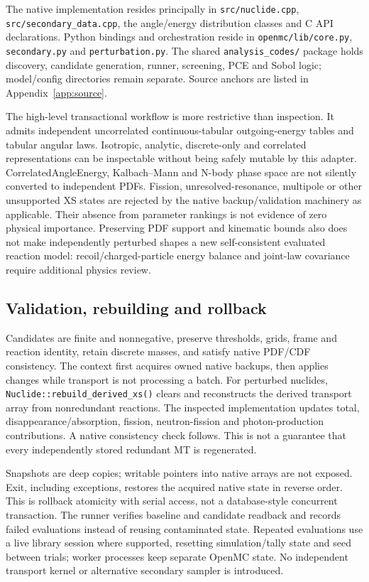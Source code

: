 The native implementation resides principally in \texttt{src/nuclide.cpp}, \texttt{src/secondary\_data.cpp}, the angle/energy distribution classes and C API declarations. Python bindings and orchestration reside in \texttt{openmc/lib/core.py}, \texttt{secondary.py} and \texttt{perturbation.py}. The shared \texttt{analysis\_codes/} package holds discovery, candidate generation, runner, screening, PCE and Sobol logic; model/config directories remain separate. Source anchors are listed in Appendix~\ref{app:source}.

The high-level transactional workflow is more restrictive than inspection. It admits independent uncorrelated continuous-tabular outgoing-energy tables and tabular angular laws. Isotropic, analytic, discrete-only and correlated representations can be inspectable without being safely mutable by this adapter. CorrelatedAngleEnergy, Kalbach--Mann and N-body phase space are not silently converted to independent PDFs. Fission, unresolved-resonance, multipole or other unsupported XS states are rejected by the native backup/validation machinery as applicable. Their absence from parameter rankings is not evidence of zero physical importance. Preserving PDF support and kinematic bounds also does not make independently perturbed shapes a new self-consistent evaluated reaction model: recoil/charged-particle energy balance and joint-law covariance require additional physics review.

\subsection{Validation, rebuilding and rollback}
Candidates are finite and nonnegative, preserve thresholds, grids, frame and reaction identity, retain discrete masses, and satisfy native PDF/CDF consistency. The context first acquires owned native backups, then applies changes while transport is not processing a batch. For perturbed nuclides, \texttt{Nuclide::rebuild\_derived\_xs()} clears and reconstructs the derived transport array from nonredundant reactions. The inspected implementation updates total, disappearance/absorption, fission, neutron-fission and photon-production contributions. A native consistency check follows. This is not a guarantee that every independently stored redundant MT is regenerated.

Snapshots are deep copies; writable pointers into native arrays are not exposed. Exit, including exceptions, restores the acquired native state in reverse order. This is rollback atomicity with serial access, not a database-style concurrent transaction. The runner verifies baseline and candidate readback and records failed evaluations instead of reusing contaminated state. Repeated evaluations use a live library session where supported, resetting simulation/tally state and seed between trials; worker processes keep separate OpenMC state. No independent transport kernel or alternative secondary sampler is introduced.

